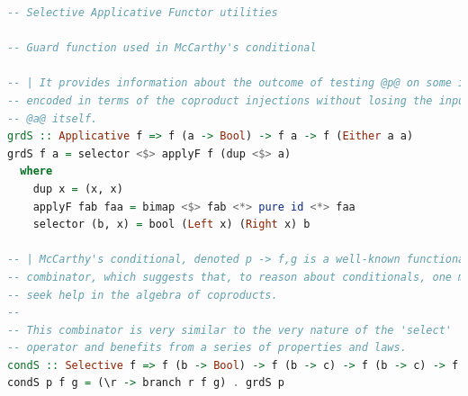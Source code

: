 \documentclass[
  oneside,
  11pt, a4paper,
  footinclude=true,
  headinclude=true,
  cleardoublepage=empty
]{scrbook}
\theoremstyle{definition}
\theoremstyle{definition}
\begin{document}
\begin{lstlisting}[language=Haskell, caption={SelectiveProb.hs},captionpos=b]
-- Selective Applicative Functor utilities

-- Guard function used in McCarthy's conditional

-- | It provides information about the outcome of testing @p@ on some input @a@,
-- encoded in terms of the coproduct injections without losing the input
-- @a@ itself.
grdS :: Applicative f => f (a -> Bool) -> f a -> f (Either a a)
grdS f a = selector <$> applyF f (dup <$> a)
  where
    dup x = (x, x)
    applyF fab faa = bimap <$> fab <*> pure id <*> faa
    selector (b, x) = bool (Left x) (Right x) b

-- | McCarthy's conditional, denoted p -> f,g is a well-known functional
-- combinator, which suggests that, to reason about conditionals, one may
-- seek help in the algebra of coproducts.
--
-- This combinator is very similar to the very nature of the 'select'
-- operator and benefits from a series of properties and laws.
condS :: Selective f => f (b -> Bool) -> f (b -> c) -> f (b -> c) -> f b -> f c
condS p f g = (\r -> branch r f g) . grdS p
    \end{lstlisting}

\end{document}
